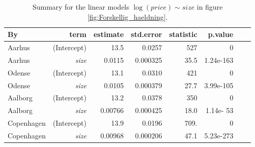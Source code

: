 \begin{table}[H]
\centering
\begin{tabular}{lrrrrrrr}
\toprule
\textbf{By}                                                                                       & \textbf{term}                & 
\textbf{estimate}            & \textbf{std.error}           & \textbf{statistic}           & \textbf{p.value}             \\
\midrule
Aarhus                                                                                & (Intercept)                  & 13.5                      & 0.0257                       & 527                         & 0                      \\
Aarhus                                                                            &  \textit{size}                   & 0.0115                       & 0.000325                         & 35.5                         & 1.24e-163                    \\
\addlinespace
Odense                                                                            &  (Intercept)                  & 13.1                     & 0.0310                       & 421                        & 0                    \\
Odense                                                                             &  \textit{size}                   & 0.0105                       & 0.000379                         & 27.7                        & 3.99e-105                    \\
\addlinespace
Aalborg                                                                           &  (Intercept)                  & 13.2                      & 0.0378                       & 350                         & 0                     \\
Aalborg                                                                            &  \textit{size}                   & 0.00766                       & 0.000425                         & 18.0                         & 1.14e- 53                    \\
\addlinespace
Copenhagen                                                                     &  (Intercept)                  & 13.9                      & 0.0196                       & 709.                        & 0                      \\
Copenhagen                                                                       &  \textit{size}                   &  0.00968                       & 0.000206                         & 47.1                        & 5.23e-273 \\                          
\bottomrule
\end{tabular}
\caption{Summary for the linear models $\log(price) \sim size$ in figure \ref{fig:Forskellig_haeldning}.}
\label{tab:my-table}
\end{table}

